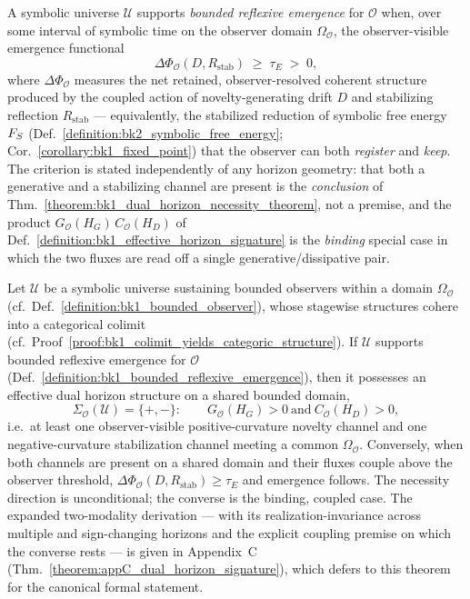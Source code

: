 \begin{definition}
\label{definition:bk1_bounded_reflexive_emergence}
A symbolic universe \(\mathcal{U}\) supports \emph{bounded reflexive emergence}
for \(\mathcal{O}\) when, over some interval of symbolic time on the observer
domain \(\Omega_{\mathcal{O}}\), the observer-visible emergence functional
\[
\Delta\Phi_{\mathcal{O}}(D,R_{\mathrm{stab}}) \;\ge\; \tau_E \;>\; 0,
\]
where \(\Delta\Phi_{\mathcal{O}}\) measures the net retained, observer-resolved
coherent structure produced by the coupled action of novelty-generating drift
\(D\) and stabilizing reflection \(R_{\mathrm{stab}}\) --- equivalently, the
stabilized reduction of symbolic free energy \(F_S\)
(Def.~\ref{definition:bk2_symbolic_free_energy};
Cor.~\ref{corollary:bk1_fixed_point}) that the observer can both \emph{register}
and \emph{keep}. The criterion is stated independently of any horizon geometry:
that both a generative and a stabilizing channel are present is the
\emph{conclusion} of Thm.~\ref{theorem:bk1_dual_horizon_necessity_theorem}, not a
premise, and the product \(G_{\mathcal{O}}(H_G)\,C_{\mathcal{O}}(H_D)\) of
Def.~\ref{definition:bk1_effective_horizon_signature} is the \emph{binding}
special case in which the two fluxes are read off a single
generative/dissipative pair.
\end{definition}

\begin{theorem}
\label{theorem:bk1_dual_horizon_necessity_theorem}
Let $\mathcal{U}$ be a symbolic universe sustaining bounded observers within a
domain $\Omega_{\mathcal{O}}$ (cf.~Def.~\ref{definition:bk1_bounded_observer}),
whose stagewise structures cohere into a categorical colimit
(cf.~Proof~\ref{proof:bk1_colimit_yields_categoric_structure}). If \(\mathcal{U}\)
supports bounded reflexive emergence for \(\mathcal{O}\)
(Def.~\ref{definition:bk1_bounded_reflexive_emergence}), then it possesses an
effective dual horizon structure on a shared bounded domain,
\[
\Sigma_{\mathcal{O}}(\mathcal{U})=\{+,-\}:
\qquad G_{\mathcal{O}}(H_G)>0 \ \text{and}\ C_{\mathcal{O}}(H_D)>0,
\]
i.e.\ at least one observer-visible positive-curvature novelty channel and one negative-curvature stabilization channel meeting a common
\(\Omega_{\mathcal{O}}\). Conversely, when both channels are present on a shared
domain and their fluxes couple above the observer threshold,
\(\Delta\Phi_{\mathcal{O}}(D,R_{\mathrm{stab}})\ge\tau_E\) and emergence follows.
The necessity direction is unconditional; the converse is the binding, coupled
case. The expanded two-modality derivation --- with its realization-invariance
across multiple and sign-changing horizons and the explicit coupling premise on
which the converse rests --- is given in Appendix~C
(Thm.~\ref{theorem:appC_dual_horizon_signature}), which defers to this theorem
for the canonical formal statement.
\end{theorem}

